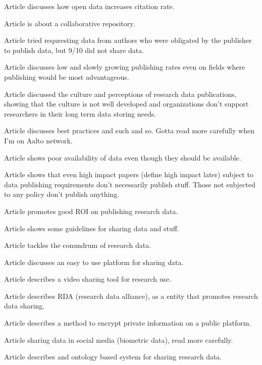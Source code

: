 Article \cite{piwowar2007sharing} discusses how open data increases citation
rate.

Article \cite{howison2005ossmole} is about a collaborative repository.

Article \cite{savage2009empirical} tried requresting data from authors who were
obligated by the publisher to publish data, but 9/10 did not share data.

Article \cite{piwowar2011shares} discusses low and slowly growing publishing
rates even on fields where publishing would be most advantageous.

Article \cite{tenopir2011data} discussed the culture and perceptions of
research data publications, showing that the culture is not well developed
and organizations don't support  researchers in their long term data storing
needs.

Article \cite{whitlock2011data} discusses best practices and such and so.
Gotta read more carefully when I'm on Aalto network.

Article \cite{wicherts2006poor} shows poor availability of data even though
they should be available.

Article \cite{alsheikh2011public} shows that even high impact papers (define
high impact later) subject to data publishing requirements don't necessarily
publish stuff. Those not subjected to any policy don't publish anything.

Article \cite{piwowar2011data} promotes good ROI on publishing research data.

Article \cite{hrynaszkiewicz2010preparing} shows some guidelines for sharing
data and stuff.

Article \cite{DBLP:journals/jasis/Borgman12} tackles the conundrum of research
data.

Article \cite{DBLP:conf/isiwi/AlamMS15} discusses an easy to use platform for
sharing data.

Article \cite{DBLP:conf/jcdl/SimonGSG15} describes a video sharing tool for research
use.

Article \cite{DBLP:journals/dlib/BermanWW14} describes RDA (research data
alliance), as a entity that promotes research data sharing.

Article \cite{DBLP:journals/jam/NohCJ14a} describes a method to encrypt private
information on a public platform.

Article \cite{DBLP:conf/ACMdis/CurmiFW14a} sharing data in social media
(biometric data), read more carefully.

Article \cite{DBLP:conf/esws/EkaputraSSB14} describes and ontology based
system for sharing research data.

